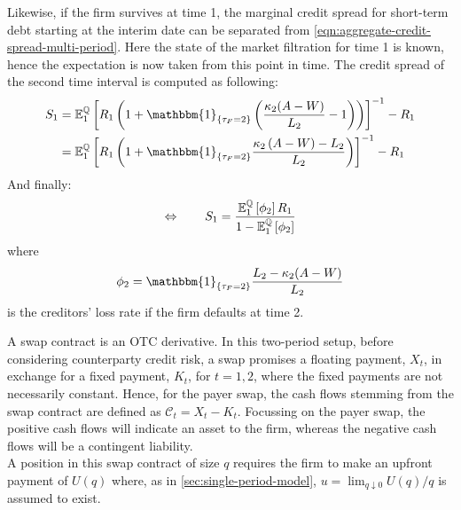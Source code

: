 \documentclass[main.tex]{subfiles}
\begin{document}
        Likewise, if the firm survives at time 1, the marginal credit spread for short-term debt starting at the interim date can be separated from \cref{eqn:aggregate-credit-spread-multi-period}.
        Here the state of the market filtration for time 1 is known, hence the expectation is now taken from this point in time.
        The credit spread of the second time interval is computed as following:
        \begin{align}
            S_1 &=
            \mathbb{E}_{1}^{\rnmeasure}\left[
                R_1 \left(
                    1
                    + \mathbbm{1}_{\{\tau_{F} = 2\}}\left(
                        \frac{\kappa_2 (A-W)}{L_2} - 1
                    \right)
                \right)
            \right]^{-1} - R_1
            \nonumber
            \\
            &=
            \mathbb{E}_{1}^{\rnmeasure}\left[
                R_1 \left(
                    1
                    + \mathbbm{1}_{\{\tau_{F} = 2\}}
                    \frac{
                        \kappa_2 \left(A - W\right) - L_2
                    }{
                        L_2
                    }
                \right)
            \right]^{-1} - R_1
            \nonumber
        \end{align}
        And finally:
        \begin{equation}
            \Leftrightarrow \qquad
            S_1 =
            \frac{
                \mathbb{E}_{1}^{\mathbb{Q}}\left[\phi_2\right]R_1
            }{
                1 - \mathbb{E}_{1}^{\mathbb{Q}}\left[\phi_2\right] 
            }
        \end{equation}
        where
        \begin{equation}
            \phi_2 =
            \mathbbm{1}_{\{\tau_{F}=2\}}
            \frac{
                L_{2}-\kappa_{2}(A-W)
            }{
                L_{2}
            }
        \end{equation}
        is the creditors' loss rate if the firm defaults at time 2.

        A swap contract is an OTC derivative.
        In this two-period setup, before considering counterparty credit risk, a swap promises a floating payment, $X_t$, in exchange for a fixed payment, $K_t$, for $t = 1,2$, where the fixed payments are not necessarily constant.
        Hence, for the payer swap, the cash flows stemming from the swap contract are defined as $\mathcal{C}_t = X_t - K_t$.
        Focussing on the payer swap, the positive cash flows will indicate an asset to the firm, whereas the negative cash flows will be a contingent liability.
        \\
        A position in this swap contract of size $q$ requires the firm to make an upfront payment of $U(q)$ where, as in \cref{sec:single-period-model}, $u = \lim_{q \downarrow 0} U(q)/q$ is assumed to exist.
\end{document}
